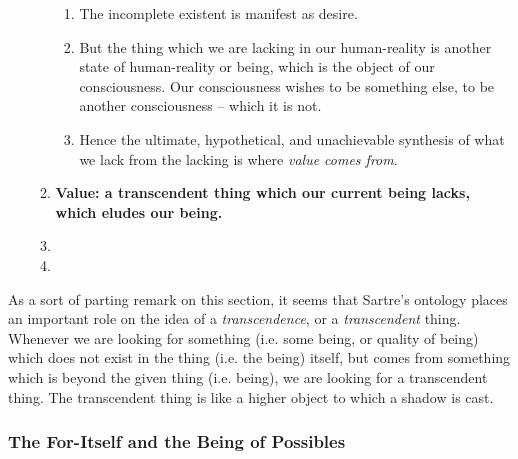\begin{enumerate}
\begin{enumerate}
\begin{enumerate}
      \item The incomplete existent is manifest as desire.
      \item But the thing which we are lacking in our human-reality is another state of human-reality or being, which is the object of our consciousness. Our consciousness wishes to be something else, to be another consciousness -- which it is not.
      \item Hence the ultimate, hypothetical, and unachievable synthesis of what we lack from the lacking is where \emph{value comes from}.
    \end{enumerate}
    \item \textbf{Value: a transcendent thing which our current being lacks, which eludes our being.} \autocite[146]{sartre}
    \item {}
    \item {}
  \end{enumerate}
\end{enumerate}

\noindent
As a sort of parting remark on this section, it seems that Sartre's ontology places an important role on the idea of a \emph{transcendence}, or a \emph{transcendent} thing. Whenever we are looking for something (i.e. some being, or quality of being) which does not exist in the thing (i.e. the being) itself, but comes from something which is beyond the given thing (i.e. being), we are looking for a transcendent thing. The transcendent thing is like a higher object to which a shadow is cast.

\subsubsection{The For-Itself and the Being of Possibles}

